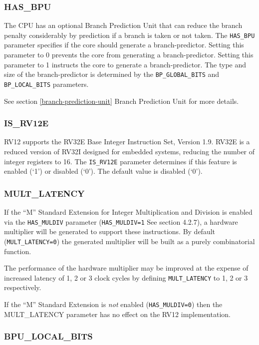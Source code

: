 \subsubsection{HAS\_BPU}\label{has_bpu}

The CPU has an optional Branch Prediction Unit that can reduce the
branch penalty considerably by prediction if a branch is taken or not
taken. The \texttt{HAS\_BPU} parameter specifies if the core should generate a
branch-predictor. Setting this parameter to 0 prevents the core from
generating a branch-predictor. Setting this parameter to 1 instructs the
core to generate a branch-predictor. The type and size of the
branch-predictor is determined by the \texttt{BP\_GLOBAL\_BITS} and
\texttt{BP\_LOCAL\_BITS} parameters.

See section \ref{branch-prediction-unit} Branch Prediction Unit for more details.

\subsubsection{IS\_RV12E}\label{is_rv12e}

RV12 supports the RV32E Base Integer Instruction Set, Version 1.9. RV32E
is a reduced version of RV32I designed for embedded systems, reducing
the number of integer registers to 16. The \texttt{IS\_RV12E} parameter
determines if this feature is enabled (`1') or disabled (`0'). The
default value is disabled (`0').

\subsubsection{MULT\_LATENCY}\label{mult_latency}

If the ``M'' Standard Extension for Integer Multiplication and Division
is enabled via the \texttt{HAS\_MULDIV} parameter (\texttt{HAS\_MULDIV=1} See section
4.2.7), a hardware multiplier will be generated to support these
instructions. By default (\texttt{MULT\_LATENCY=0}) the generated multiplier will
be built as a purely combinatorial function.

The performance of the hardware multiplier may be improved at the
expense of increased latency of 1, 2 or 3 clock cycles by defining
\texttt{MULT\_LATENCY} to 1, 2 or 3 respectively.

If the ``M'' Standard Extension is \emph{not} enabled (\texttt{HAS\_MULDIV=0})
then the MULT\_LATENCY parameter has no effect on the RV12
implementation.

\subsubsection{BPU\_LOCAL\_BITS}\label{bpu_local_bits}

